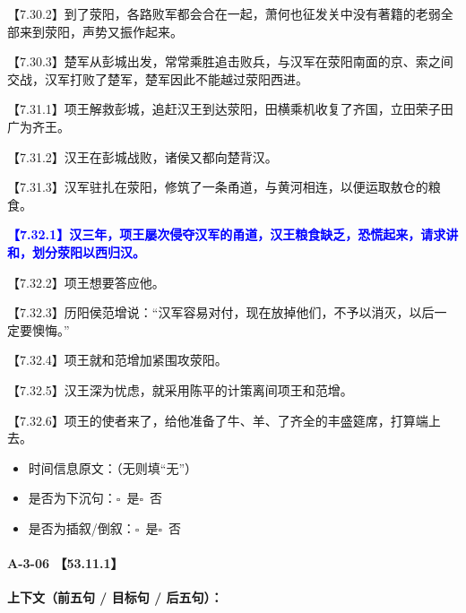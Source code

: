 \documentclass[fontset=none,11pt,a4paper]{ctexart}
\newcommand{\answerline}[1]{\underline{\hspace{#1}}}
\newcommand{\choicebox}[1]{$\square$~#1}
\begin{document}
\noindent 【7.30.2】到了荥阳，各路败军都会合在一起，萧何也征发关中没有著籍的老弱全部来到荥阳，声势又振作起来。\par
\noindent 【7.30.3】楚军从彭城出发，常常乘胜追击败兵，与汉军在荥阳南面的京、索之间交战，汉军打败了楚军，楚军因此不能越过荥阳西进。\par
\noindent 【7.31.1】项王解救彭城，追赶汉王到达荥阳，田横乘机收复了齐国，立田荣子田广为齐王。\par
\noindent 【7.31.2】汉王在彭城战败，诸侯又都向楚背汉。\par
\noindent 【7.31.3】汉军驻扎在荥阳，修筑了一条甬道，与黄河相连，以便运取敖仓的粮食。\par
\noindent \textcolor{blue}{\textbf{【7.32.1】汉三年，项王屡次侵夺汉军的甬道，汉王粮食缺乏，恐慌起来，请求讲和，划分荥阳以西归汉。}}\par
\noindent 【7.32.2】项王想要答应他。\par
\noindent 【7.32.3】历阳侯范增说：“汉军容易对付，现在放掉他们，不予以消灭，以后一定要懊悔。”\par
\noindent 【7.32.4】项王就和范增加紧围攻荥阳。\par
\noindent 【7.32.5】汉王深为忧虑，就采用陈平的计策离间项王和范增。\par
\noindent 【7.32.6】项王的使者来了，给他准备了牛、羊、了齐全的丰盛筵席，打算端上去。\par

\begin{itemize}
  \item 时间信息原文：\answerline{7.5cm}（无则填“无”）
  \item 是否为下沉句：\choicebox{是}\quad \choicebox{否}
  \item 是否为插叙/倒叙：\choicebox{是}\quad \choicebox{否}
\end{itemize}

\paragraph{A-3-06 \quad 【53.11.1】}
\textbf{上下文（前五句 / 目标句 / 后五句）：}
\end{document}
